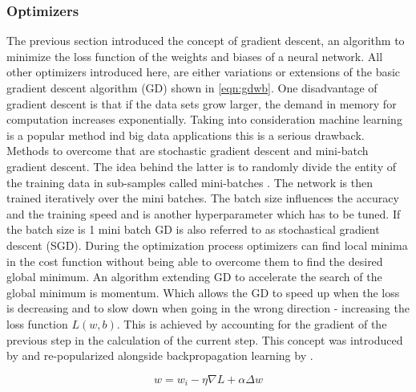 \subsubsection{Optimizers}
The previous section introduced the concept of gradient descent, an algorithm to minimize the loss function of the
weights and biases of a neural network. All other optimizers introduced here, are either variations or extensions of the
basic gradient descent algorithm (GD) shown in \ref{eqn:gdwb}. One disadvantage of gradient descent is that if the data
sets grow larger, the demand in memory for computation increases exponentially. Taking into consideration machine
learning is a popular method ind big data applications this is a serious drawback. Methods to overcome that are
stochastic gradient descent and mini-batch gradient descent.  The idea behind the latter is to randomly divide the
entity of the training data in sub-samples called mini-batches \cite{bottou-bousquet-2008}. The network is then trained
iteratively over the mini batches. The batch size influences the accuracy and the training speed and is another
hyperparameter which has to be tuned. If the batch size is 1 mini batch GD is also referred to as stochastical gradient
descent (SGD).  During the optimization process optimizers can find local minima in the cost function without being able
to overcome them to find the desired global minimum. An algorithm extending GD to accelerate the search of the global
minimum is momentum. Which allows the GD to speed up when the loss is decreasing and to slow down when going in the
wrong direction - increasing the loss function $L(w,b)$. This is achieved by accounting for the gradient of the previous
step in the calculation of the current step. This concept was introduced by \cite{polyak1964} and re-popularized alongside backpropagation learning by \cite{rumelhart1988learning}.


\begin{equation}
  w = w_i - \eta \nabla L + \alpha \Delta w
  \label{eqn:momentum}
\end{equation}

